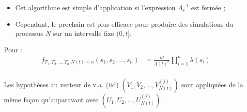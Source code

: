 \documentclass[10pt, french]{article}
\begin{document}
\begin{multicols*}{2}
\begin{algo2}
\tcbline

\begin{itemize}
	\item	Cet algorithme est simple d'application si l'expression $\Lambda_{s}^{-1}$ est fermée ;
	\item	Cependant, le prochain est plus efficace pour produire des simulations du processus $\underline{N}$ sur un intervalle fixe $(0, t]$.
\end{itemize}
\end{algo2}

Pour  :
\begin{align*}
	f_{T_{1}, T_{2}, \dots, T_{n} | N(t)	=	n}(s_{1}, s_{2}, \dots, s_{n})	
	&=	\frac{n!}{\Lambda(t)^{n}}\prod_{i = 1}^{n}\lambda(s_{i})	\\
\end{align*}

Les hypothèses au vecteur de v.a. (iid) $\left(V_{1}, V_{2}, \dots, V_{N(t)}^{(j)}\right)$ sont appliquées de la même façon qu'auparavant avec $\left(U_{1}, U_{2}, \dots, U_{N(t)}^{(j)}\right)$.


\end{multicols*}
\end{document}
